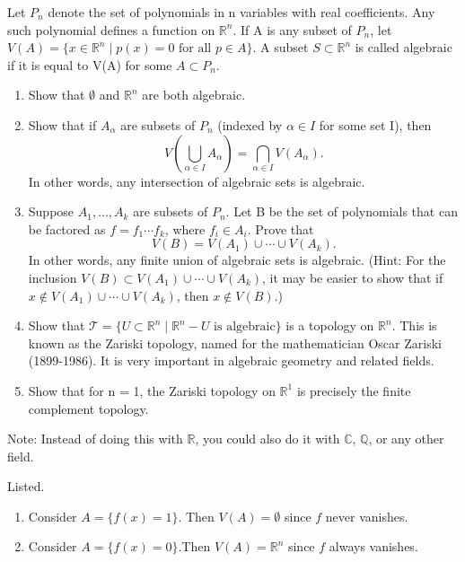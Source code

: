   \begin{exercise}
    Let $P_n$ denote the set of polynomials in n variables with real coefficients. Any such polynomial defines a function on $\mathbb{R}^n$. If A is any subset of $P_n$, let $V(A) = \{x \in \mathbb{R}^n \mid p(x) = 0 \text{ for all } p \in A\}$. A subset $S \subset \mathbb{R}^n$ is called algebraic if it is equal to V(A) for some $A \subset P_n$.

    \begin{enumerate}
      \item Show that $\emptyset$ and $\mathbb{R}^n$ are both algebraic.

      \item Show that if $A_\alpha$ are subsets of $P_n$ (indexed by $\alpha \in I$ for some set I), then
      \[V\left(\bigcup_{\alpha\in I} A_\alpha\right) = \bigcap_{\alpha\in I} V(A_\alpha).\]
      In other words, any intersection of algebraic sets is algebraic.

      \item Suppose $A_1,\ldots,A_k$ are subsets of $P_n$. Let B be the set of polynomials that can be factored as $f = f_1 \cdots f_k$, where $f_i \in A_i$. Prove that
      \[V(B) = V(A_1) \cup \cdots \cup V(A_k).\]
      In other words, any finite union of algebraic sets is algebraic. (Hint: For the inclusion $V(B) \subset V(A_1) \cup \cdots \cup V(A_k)$, it may be easier to show that if $x \not\in V(A_1) \cup \cdots \cup V(A_k)$, then $x \not\in V(B)$.)

      \item Show that $\mathcal{T} = \{U \subset \mathbb{R}^n \mid \mathbb{R}^n - U \text{ is algebraic}\}$ is a topology on $\mathbb{R}^n$. This is known as the Zariski topology, named for the mathematician Oscar Zariski (1899-1986). It is very important in algebraic geometry and related fields.

      \item Show that for n = 1, the Zariski topology on $\mathbb{R}^1$ is precisely the finite complement topology.
    \end{enumerate}

    Note: Instead of doing this with $\mathbb{R}$, you could also do it with $\mathbb{C}$, $\mathbb{Q}$, or any other field.
  \end{exercise}
  \begin{solution}[a]
    Listed. 
    \begin{enumerate}
      \item Consider $A = \{ f(x) = 1\}$. Then $V(A) = \emptyset$ since $f$ never vanishes. 
      \item Consider $A = \{ f(x) = 0 \}$.Then $V(A) = \mathbb{R}^n$ since $f$ always vanishes. 
    \end{enumerate}
  \end{solution}
